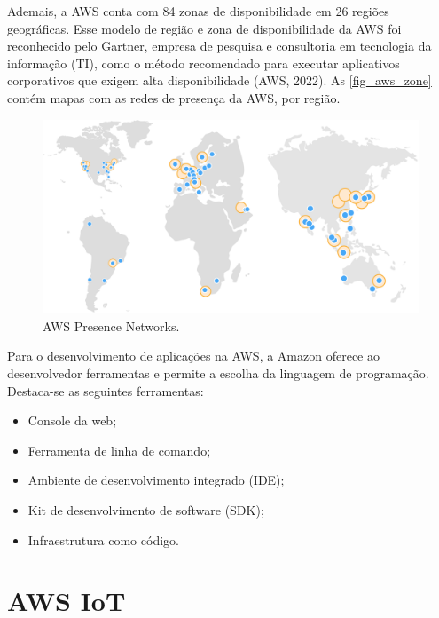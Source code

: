\documentclass[
    12pt,
    openright,
    twoside,
    a4paper,
    english,
    spanish,
    brazil,
    ]{abntex2}
\begin{document}
Ademais, a AWS conta com 84 zonas de disponibilidade em 26 regiões geográficas. Esse modelo de região e zona de disponibilidade da AWS foi reconhecido pelo Gartner, empresa de pesquisa e consultoria em tecnologia da informação (TI), como o método recomendado para executar aplicativos corporativos que exigem alta disponibilidade (AWS, 2022). As \autoref{fig_aws_zone} contém mapas com as redes de presença da AWS, por região.

\begin{figure}[htb]
	\caption{AWS Presence Networks.}\label{fig_aws_zone}
	\begin{center}
		\includegraphics[scale=0.3]{Images/aws_zones.pdf}
	\end{center}
\end{figure}

Para o desenvolvimento de aplicações na AWS, a Amazon oferece ao desenvolvedor ferramentas e permite a escolha da linguagem de programação. Destaca-se as seguintes ferramentas:
\begin{itemize}
	\item Console da web;
	\item Ferramenta de linha de comando;
	\item Ambiente de desenvolvimento integrado (IDE);
	\item Kit de desenvolvimento de software (SDK);
	\item Infraestrutura como código.
\end{itemize}


\section{AWS IoT}
\end{document}
